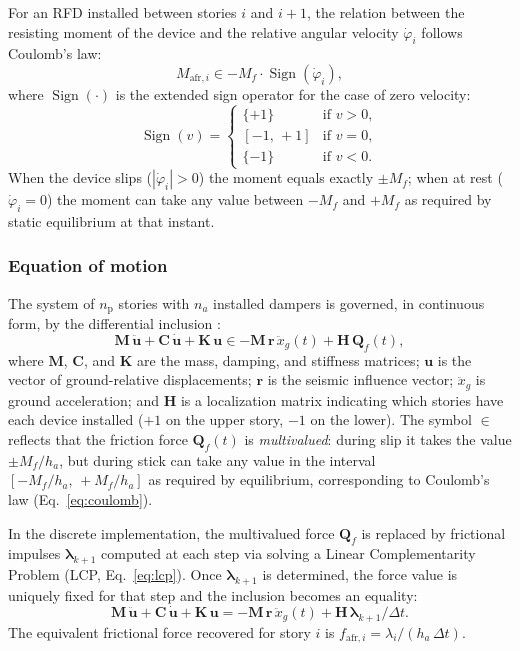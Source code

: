 \documentclass[preprint,12pt,authoryear]{elsarticle}
\newcommand{\np}{n_{\mathrm{p}}}              %
\newcommand{\Mf}{M_{\!f}}
\newcommand{\ha}{h_a}
\begin{document}
For an RFD installed between stories $i$ and $i+1$, the relation between the resisting moment of the
device and the relative angular velocity $\dot{\varphi}_i$ follows Coulomb's law:
\begin{equation}
    M_{\mathrm{afr},i} \in -\Mf \cdot \operatorname{Sign}\!\left(\dot{\varphi}_i\right),
    \label{eq:coulomb}
\end{equation}
where $\operatorname{Sign}(\cdot)$ is the extended sign operator for the case of zero velocity:
\begin{equation}
    \operatorname{Sign}(v) =
    \begin{cases}
        \{+1\}    & \text{if } v > 0, \\
        [-1,\,+1] & \text{if } v = 0, \\
        \{-1\}    & \text{if } v < 0.
    \end{cases}
    \label{eq:sign}
\end{equation}
When the device slips ($|\dot{\varphi}_i|>0$) the moment equals exactly $\pm\Mf$; when at rest
($\dot{\varphi}_i=0$) the moment can take any value between $-\Mf$ and $+\Mf$ as required by static
equilibrium at that instant.

\subsubsection*{Equation of motion}

The system of $\np$ stories with $n_a$ installed dampers is governed, in continuous form, by the
differential inclusion \citep{Namorado2024}:
\begin{equation}
    \bm{M}\,\ddot{\bm{u}} + \bm{C}\,\dot{\bm{u}} + \bm{K}\,\bm{u}
    \in -\bm{M}\,\bm{r}\,\ddot{x}_g(t) + \bm{H}\,\bm{Q}_f(t),
    \label{eq:eom}
\end{equation}
where $\bm{M}$, $\bm{C}$, and $\bm{K}$ are the mass, damping, and stiffness matrices; $\bm{u}$ is
the vector of ground-relative displacements; $\bm{r}$ is the seismic influence vector; $\ddot{x}_g$
is ground acceleration; and $\bm{H}$ is a localization matrix indicating which stories have each
device installed ($+1$ on the upper story, $-1$ on the lower). The symbol $\in$ reflects that the
friction force $\bm{Q}_f(t)$ is \textit{multivalued}: during slip it takes the value $\pm\Mf/\ha$,
but during stick can take any value in the interval $[-\Mf/\ha,\,+\Mf/\ha]$ as required by equilibrium,
corresponding to Coulomb's law (Eq.~\ref{eq:coulomb}).

In the discrete implementation, the multivalued force $\bm{Q}_f$ is replaced by frictional impulses
$\bm{\lambda}_{k+1}$ computed at each step via solving a Linear Complementarity Problem (LCP, Eq.~\ref{eq:lcp}).
Once $\bm{\lambda}_{k+1}$ is determined, the force value is uniquely fixed for that step and the
inclusion becomes an equality:
\begin{equation}
    \bm{M}\,\ddot{\bm{u}} + \bm{C}\,\dot{\bm{u}} + \bm{K}\,\bm{u}
    = -\bm{M}\,\bm{r}\,\ddot{x}_g(t) + \bm{H}\,\bm{\lambda}_{k+1}/\Delta t.
    \label{eq:eom_disc}
\end{equation}
The equivalent frictional force recovered for story $i$ is
$f_{\mathrm{afr},i} = \lambda_i / (\ha\,\Delta t)$.
\end{document}
